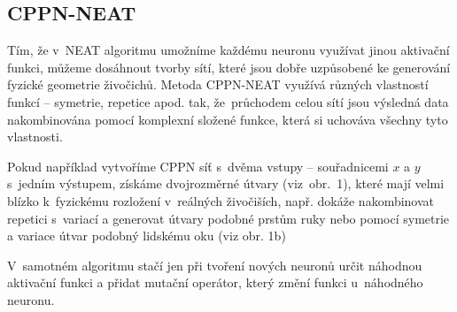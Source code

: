 \documentclass[a4]{article}
\begin{document}
\subsection{CPPN-NEAT}
Tím, že v~NEAT algoritmu umožníme každému neuronu využívat jinou aktivační funkci, můžeme dosáhnout tvorby sítí, které jsou dobře uzpůsobené ke generování fyzické geometrie živočichů. Metoda CPPN-NEAT\cite{cppn-neat} využívá různých vlastností funkcí -- symetrie, repetice apod. tak, že~průchodem celou sítí jsou výsledná data nakombinována pomocí komplexní složené funkce, která si uchováva všechny tyto vlastnosti.\par
Pokud například vytvoříme CPPN síť s~dvěma vstupy -- souřadnicemi $x$ a $y$ s~jedním výstupem, získáme dvojrozměrné útvary (viz~obr.~1), které mají velmi blízko k~fyzickému rozložení v~reálných živočiších, např. dokáže nakombinovat repetici s~variací a generovat útvary podobné prstům ruky nebo pomocí symetrie a variace útvar podobný lidskému oku (viz obr. 1b)\par
V~samotném algoritmu stačí jen při tvoření nových neuronů určit náhodnou aktivační funkci a přidat mutační operátor, který změní funkci u~náhodného neuronu.\par
\end{document}
